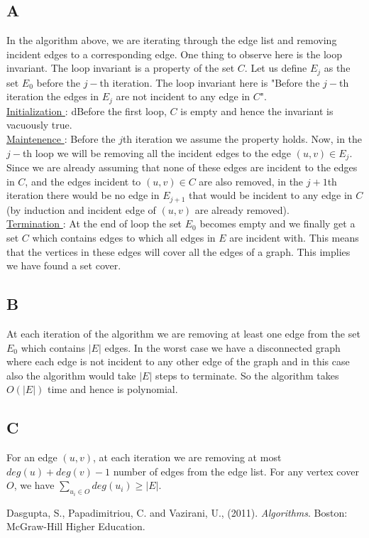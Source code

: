 \documentclass[14pt]{article}
\begin{document}
		\subsection*{A}
			\noindent
			\newline
			In the algorithm above, we are iterating through the edge list and removing incident edges to a corresponding edge. One thing to observe here is the loop invariant. The loop invariant is a property of the set $C$. Let us define $E_j$ as the set $E_0$ before the $j-$th iteration. The loop invariant here is "Before the $j-$th iteration the edges in $E_j$ are not incident to any edge in $C$".\\
			\newline
			\underline{Initialization }: dBefore the first loop, $C$ is empty and hence the invariant is vacuously true.\\
			\newline
			\underline{Maintenence }: Before the $j$th iteration we assume the property holds. Now, in the $j-$th loop we will be removing all the incident edges to the edge $(u, v) \in E_j$. Since we are already assuming that none of these edges are incident to the edges in $C$, and the edges incident to $(u, v) \in C$ are also removed, in the $j+1$th iteration there would be no edge in $E_{j+1}$ that would be incident to any edge in $C$ (by induction and incident edge of $(u, v)$ are already removed).\\
			\newline
			\underline{Termination }: At the end of loop the set $E_0$ becomes empty and we finally get a set $C$ which contains edges to which all edges in $E$ are incident with. This means that the vertices in these edges will cover all the edges of a graph. This implies we have found a set cover. \\
			
		\subsection*{B}
			\noindent
			\newline
			At each iteration of the algorithm we are removing at least one edge from the set $E_0$ which contains $|E|$ edges. In the worst case we have a disconnected graph where each edge is not incident to any other edge of the graph and in this case also the algorithm would take $|E|$ steps to terminate. So the algorithm takes $O(|E|)$ time and hence is polynomial.\\
			
		\subsection*{C}
			\noindent
			\newline
			For an edge $(u, v)$, at each iteration we are removing at most $deg(u) + deg(v) - 1$ number of edges from the edge list. For any vertex cover $O$, we have $\sum_{u_i \in O}deg(u_i) \geq |E|$.
	 
	\begin{thebibliography}{1}
		 Dasgupta, S., Papadimitriou, C. and Vazirani, U., (2011). \emph{Algorithms}. Boston: McGraw-Hill Higher Education.	
	\end{thebibliography}
		
	
\end{document}

